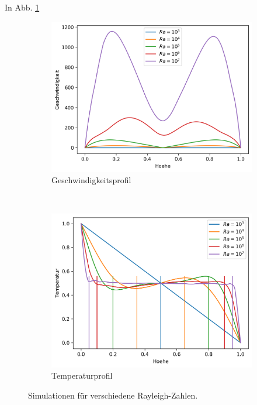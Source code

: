 \documentclass[12pt,a4paper,titlepage,headinclude]{scrartcl}
\numberwithin{equation}{subsection}
\begin{document}
In Abb. \ref{fig:v_num}
\begin{figure}[!ht]
	\centering
    \begin{subfigure}[t]{0.49\textwidth}
        \centering
	\includegraphics[width=0.9\linewidth]{V}
        \caption{Geschwindigkeitsprofil}
	\label{fig:v_num}
    \end{subfigure}%
    ~ 
    \begin{subfigure}[t]{0.49\textwidth}
        \centering
	\includegraphics[width=0.9\linewidth]{T}
        \caption{Temperaturprofil}
	\label{fig:t_num}
    \end{subfigure}
    \caption{Simulationen f\"ur verschiedene Rayleigh-Zahlen.}
\end{figure}
\end{document}
